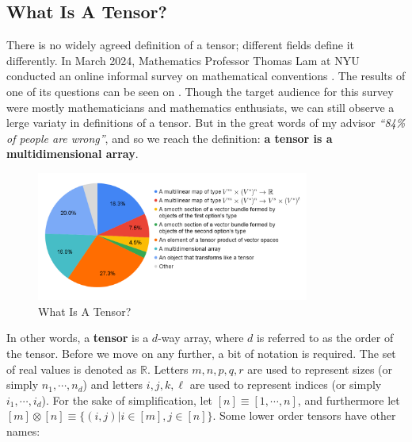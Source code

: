 
\subsection{What Is A Tensor?} \label{sec:What is A Tensor}
    There is no widely agreed definition of a tensor; different fields define it
    differently. In March 2024, Mathematics Professor Thomas Lam at NYU
    conducted an online informal survey on mathematical conventions
    \cite{Math_Conventions_Survey}. The results of one of its questions can be
    seen on . Though the target audience for
    this survey were mostly mathematicians and mathematics enthusiats, we can
    still observe a lerge variaty in definitions of a tensor. But in the great
    words of my advisor \textit{``84\% of people are wrong''}, and so we reach
    the definition: \textbf{a tensor is a multidimensional array}. 

    \begin{figure}[ht]
        \centering
        \includegraphics[width=0.8\textwidth, keepaspectratio]{figures/WhatIsATensor.png} %
        \caption[What Is A Tensor?]{What Is A Tensor?}
        \label{fig:What Is A Tensor?}
    \end{figure}

    In other words, a \textbf{tensor} is a $d$-way array, where $d$ is referred
    to as the order of the tensor. Before we move on any further, a bit of
    notation is required. The set of real values is denoted as $\mathbb{R}$.
    Letters $m, n, p, q, r$ are used to represent sizes (or simply $n_1, \cdots,
    n_d$) and letters $i, j, k, \ell$ are used to represent indices (or simply
    $i_1, \cdots, i_d$). For the sake of simplification, let $[n] \equiv [1,
    \cdots, n]$, and furthermore let $[m] \otimes [n] \equiv \{ (i, j) |
    i\in[m], j\in[n]\}$. Some lower order tensors have other names:


